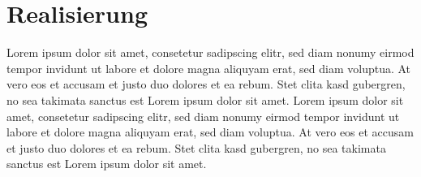 \section{Realisierung}
Lorem ipsum dolor sit amet, consetetur sadipscing elitr, sed diam nonumy eirmod tempor invidunt ut labore et dolore magna aliquyam erat, sed diam voluptua. At vero eos et accusam et justo duo dolores et ea rebum. Stet clita kasd gubergren, no sea takimata sanctus est Lorem ipsum dolor sit amet. Lorem ipsum dolor sit amet, consetetur sadipscing elitr, sed diam nonumy eirmod tempor invidunt ut labore et dolore magna aliquyam erat, sed diam voluptua. At vero eos et accusam et justo duo dolores et ea rebum. Stet clita kasd gubergren, no sea takimata sanctus est Lorem ipsum dolor sit amet.